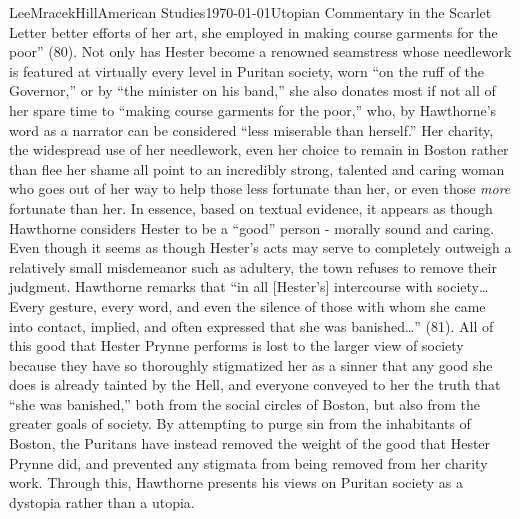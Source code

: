 \documentclass[12pt, letterpaper]{article}
\begin{document}
\begin{mla}{Lee}{Mracek}{Hill}{American Studies}{\today}{Utopian Commentary in the Scarlet Letter}
        better efforts of her art, she employed in making course garments for the poor'' (80). Not only has Hester become a renowned seamstress whose needlework is featured at virtually every level in Puritan society, worn ``on the ruff of the Governor,'' or by ``the minister on his band,'' she also donates most if not all of her spare time to ``making course garments for the poor,'' who, by Hawthorne's word as a narrator can be considered ``less miserable than herself.'' Her charity, the widespread use of her needlework, even her choice to remain in Boston rather than flee her shame all point to an incredibly strong, talented and caring woman who goes out of her way to help those less fortunate than her, or even those \textit{more} fortunate than her. In essence, based on textual evidence, it appears as though Hawthorne considers Hester to be a ``good'' person - morally sound and caring. Even though it seems as though Hester's acts may serve to completely outweigh a relatively small misdemeanor such as adultery, the town refuses to remove their judgment. Hawthorne remarks that ``in all [Hester's] intercourse with society\ldots 
        Every gesture, every word, and even the silence of those with whom she came into contact, implied, and often expressed that she was banished\ldots'' (81). All of this good that Hester Prynne performs is lost to the larger view of society because they have so thoroughly stigmatized her as a sinner that any good she does is already tainted by the Hell, and everyone conveyed to her the truth that ``she was banished,'' both from the social circles of Boston, but also from the greater goals of society. By attempting to purge sin from the inhabitants of Boston, the Puritans have instead removed the weight of the good that Hester Prynne did, and prevented any stigmata from being removed from her charity work. Through this, Hawthorne presents his views on Puritan society as a dystopia rather than a utopia. \\

\end{mla}
\end{document}
